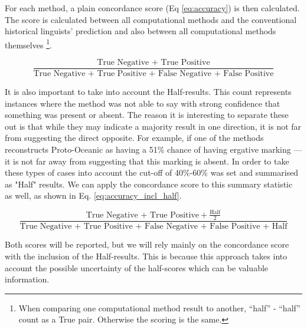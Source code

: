 \documentclass[12pt,letterpaper]{article}
\begin{document}
For each method, a plain concordance score (Eq \eqref{eq:accuracy}) is then calculated. The score is calculated between all computational methods and the conventional historical linguists' prediction and also between all computational methods themselves \footnote{When comparing one computational method result to another, ``half'' - ``half'' count as a True pair. Otherwise the scoring is the same.}.

\begin{equation}\label{eq:accuracy}
\frac{\text{True Negative + True Positive}}{\text{True Negative + True Positive + False Negative + False Positive}}
\end{equation}

It is also important to take into account the Half-results. This count represents instances where the method was not able to say with strong confidence that something was present or absent. The reason it is interesting to separate these out is that while they may indicate a majority result in one direction, it is not far from suggesting the direct opposite. For example, if one of the methods reconstructs Proto-Oceanic as having a 51\% chance of having ergative marking --- it is not far away from suggesting that this marking is absent. In order to take these types of cases into account the cut-off of 40\%-60\% was set and summarised as "Half" results. We can apply the concordance score to this summary statistic as well, as shown in Eq. \eqref{eq:accuracy_incl_half}. 

\begin{equation}\label{eq:accuracy_incl_half}
\frac{\text{True Negative + True Positive} + \frac{\text{Half}}{2}}{\text{True Negative + True Positive + False Negative + False Positive + Half}}
\end{equation}

Both scores will be reported, but we will rely mainly on the concordance score with the inclusion of the Half-results. This is because this approach takes into account the possible uncertainty of the half-scores which can be valuable information.
\end{document}
